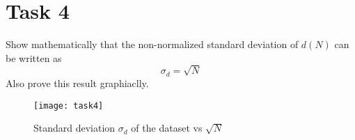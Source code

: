 \newpage
\section{Task 4}
Show mathematically that the non-normalized standard deviation of $d(N)$ can be written as
\begin{equation}
    \sigma_d = \sqrt{N}
\end{equation}
Also prove this result graphiaclly.

\begin{listing}[H]
    
\end{listing}

\begin{figure}[H]
    \centering
    \texttt{[image: task4]}
    \caption{Standard deviation $\sigma_d$ of the dataset vs $\sqrt{N}$}
\end{figure}